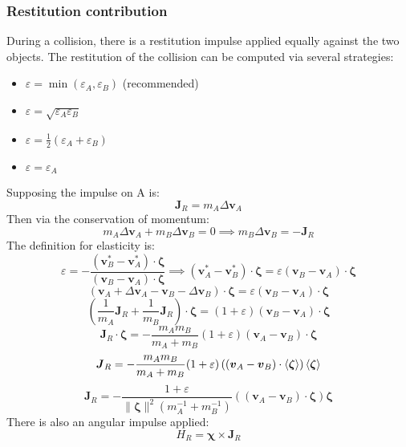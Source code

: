 \documentclass[10pt]{report}
\begin{document}
\subsubsection{Restitution contribution}
During a collision, there is a restitution impulse applied equally against the two objects. The restitution of the collision can be computed via several strategies:
\begin{itemize}
\item $\varepsilon=\min(\varepsilon_A,\varepsilon_B)$ (recommended)
\item $\varepsilon=\sqrt{\varepsilon_A\varepsilon_B}$
\item $\varepsilon=\frac{1}{2}(\varepsilon_A+\varepsilon_B)$
\item $\varepsilon=\varepsilon_A$
\end{itemize}
Supposing the impulse on A is:
\begin{equation}\boldsymbol{J}_R=m_A\Delta\boldsymbol{v}_A\end{equation}
Then via the conservation of momentum:
\begin{equation}m_A\Delta\boldsymbol{v}_A+m_B\Delta\boldsymbol{v}_B=0\implies m_B\Delta\boldsymbol{v}_B=-\boldsymbol{J}_R\end{equation}
The definition for elasticity is:
\begin{equation}\varepsilon=-\frac{(\boldsymbol{v}_B^*-\boldsymbol{v}_A^*)\cdot\boldsymbol{\zeta}}{(\boldsymbol{v}_B-\boldsymbol{v}_A)\cdot\boldsymbol{\zeta}}\implies(\boldsymbol{v}_A^*-\boldsymbol{v}_B^*)\cdot\boldsymbol{\zeta}=\varepsilon(\boldsymbol{v}_B-\boldsymbol{v}_A)\cdot\boldsymbol{\zeta}\end{equation}
\begin{equation}(\boldsymbol{v}_A+\Delta\boldsymbol{v}_A-\boldsymbol{v}_B-\Delta\boldsymbol{v}_B)\cdot\boldsymbol{\zeta}=\varepsilon(\boldsymbol{v}_B-\boldsymbol{v}_A)\cdot\boldsymbol{\zeta}\end{equation}
\begin{equation}\left(\frac{1}{m_A}\boldsymbol{J}_R+\frac{1}{m_B}\boldsymbol{J}_R\right)\cdot\boldsymbol{\zeta}=(1+\varepsilon)(\boldsymbol{v}_B-\boldsymbol{v}_A)\cdot\boldsymbol{\zeta}\end{equation}
\begin{equation}\boldsymbol{J}_R\cdot\boldsymbol{\zeta}=-\frac{m_Am_B}{m_A+m_B}(1+\varepsilon)(\boldsymbol{v}_A-\boldsymbol{v}_B)\cdot\boldsymbol{\zeta}\end{equation}
\begin{equation}\boldsymbol{J}_R=-\frac{m_Am_B}{m_A+m_B}(1+\varepsilon)\left((\boldsymbol{v}_A-\boldsymbol{v}_B)\cdot\braket{\boldsymbol{\zeta}}\right)\braket{\boldsymbol{\zeta}}\end{equation}
\begin{equation}\boldsymbol{J}_R=-\frac{1+\varepsilon}{\|\boldsymbol{\zeta}\|^2\left(m_A^{-1}+m_B^{-1}\right)}\left((\boldsymbol{v}_A-\boldsymbol{v}_B)\cdot\boldsymbol{\zeta}\right)\boldsymbol{\zeta}\end{equation}
There is also an angular impulse applied:
\begin{equation}H_R=\boldsymbol{\chi}\times\boldsymbol{J}_R\end{equation}
\end{document}
